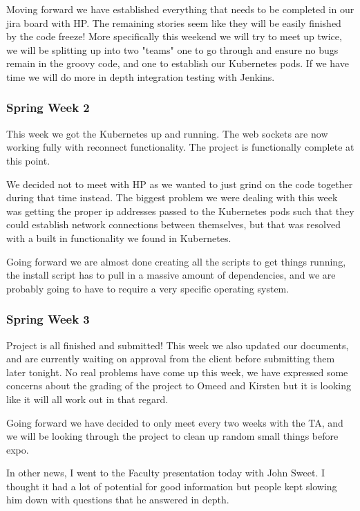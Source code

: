 \documentclass[onecolumn, draftclsnofoot,10pt, compsoc]{IEEEtran}
\begin{document}
Moving forward we have established everything that needs to be completed in our jira board with HP. The remaining stories seem like they will be easily finished by the code freeze! More specifically this weekend we will try to meet up twice, we will be splitting up into two "teams" one to go through and ensure no bugs remain in the groovy code, and one to establish our Kubernetes pods. If we have time we will do more in depth integration testing with Jenkins.

\subsubsection*{Spring Week 2}
This week we got the Kubernetes up and running. The web sockets are now working fully with reconnect functionality. The project is functionally complete at this point.

We decided not to meet with HP as we wanted to just grind on the code together during that time instead. The biggest problem we were dealing with this week was getting the proper ip addresses passed to the Kubernetes pods such that they could establish network connections between themselves, but that was resolved with a built in functionality we found in Kubernetes.

Going forward we are almost done creating all the scripts to get things running, the install script has to pull in a massive amount of dependencies, and we are probably going to have to require a very specific operating system.

\subsubsection*{Spring Week 3}
Project is all finished and submitted! This week we also updated our documents, and are currently waiting on approval from the client before submitting them later tonight. No real problems have come up this week, we have expressed some concerns about the grading of the project to Omeed and Kirsten but it is looking like it will all work out in that regard.

Going forward we have decided to only meet every two weeks with the TA, and we will be looking through the project to clean up random small things before expo.

In other news, I went to the Faculty presentation today with John Sweet. I thought it had a lot of potential for good information but people kept slowing him down with questions that he answered in depth.
\end{document}
